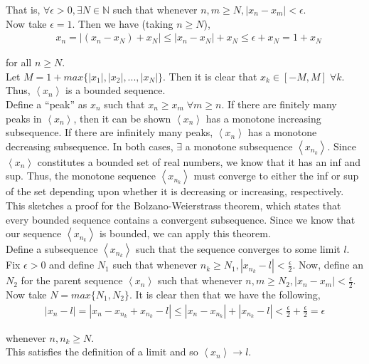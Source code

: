 \documentclass[12pt]{article}
\begin{document}
That is, $\forall \epsilon > 0, \exists N \in \mathbb{N}$ such that whenever $n, m \geq N, | x_n - x_m | < \epsilon$.\\

Now take $\epsilon = 1$. Then we have (taking $n \geq N$),
\begin{align*}
& x_n = | (x_n - x_N) + x_N | \leq | x_n - x_N | + x_N \leq \epsilon + x_N = 1 + x_N
\end{align*}

for all $n \geq N$.\\

Let $M = 1 + max\{|x_1|, |x_2|, ..., |x_N|\}$. Then it is clear that $x_k \in [-M, M] \; \forall k$. Thus, $\left<x_n\right>$ is a bounded sequence.\\

Define a ``peak'' as $x_n$ such that $x_n \geq x_m \; \forall m \geq n$. If there are finitely many peaks in $\left<x_n\right>$, then it can be shown $\left<x_n\right>$ has a monotone increasing subsequence. If there are infinitely many peaks, $\left<x_n\right>$ has a monotone decreasing subsequence. In both cases, $\exists$ a monotone subsequence $\left<x_{n_k}\right>$. Since $\left<x_n\right>$ constitutes a bounded set of real numbers, we know that it has an inf and sup. Thus, the monotone sequence $\left<x_{n_k}\right>$ must converge to either the inf or sup of the set depending upon whether it is decreasing or increasing, respectively. This sketches a proof for the Bolzano-Weierstrass theorem, which states that every bounded sequence contains a convergent subsequence. Since we know that our sequence $\left<x_{n_k}\right>$ is bounded, we can apply this theorem. \\

Define a subsequence $\left<x_{n_k}\right>$ such that the sequence converges to some limit $l$. Fix $\epsilon > 0$ and define $N_1$ such that whenever $n_k \geq N_1, | x_{n_k} - l | < \frac{\epsilon}{2}$. Now, define an $N_2$ for the parent sequence $\left<x_n\right>$ such that whenever $n, m \geq N_2, | x_n - x_m | < \frac{\epsilon}{2}$.\\

Now take $N = max\{N_1, N_2\}$. It is clear then that we have the following,
\begin{align*}
| x_n - l | = | x_n - x_{n_k} + x_{n_k} - l | \leq | x_n - x_{n_k} | + | x_{n_k} - l | < \frac{\epsilon}{2} + \frac{\epsilon}{2} = \epsilon
\end{align*}

whenever $n, n_k \geq N$.\\

This satisfies the definition of a limit and so $\left<x_n\right> \to l$.
\end{document}
